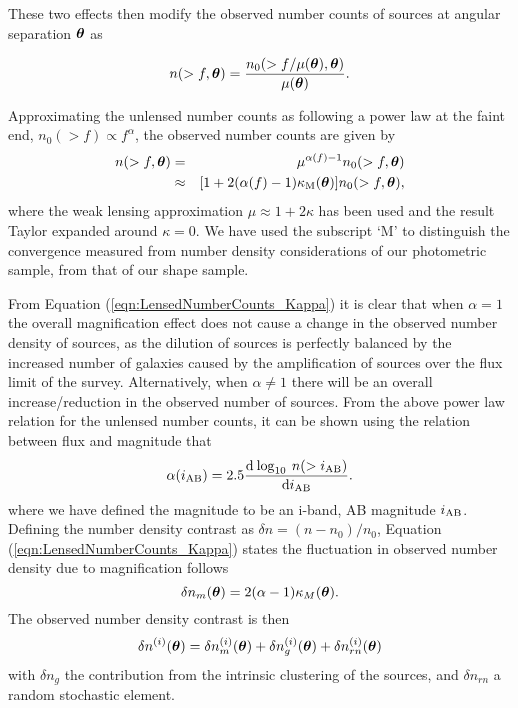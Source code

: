 \documentclass[useAMS,usenatbib,times,letter,amssymb]{mn2e}
\def\be{\begin{equation}}
\def\ee{\end{equation}}
\def\bea{\begin{eqnarray}}
\def\eea{\end{eqnarray}}
\newcommand{\bm}[1]{\mbox{\boldmath{$#1$}}}   %
\begin{document}
These two effects then modify the observed number counts  of sources at angular separation ${\bm \theta}$ as 

\begin{equation}\label{eqn:Lensed-UnlensedNumberCounts}
n(>f,{\bm \theta}) = \frac{n_0(>f/\mu({\bm\theta}),{\bm\theta})}{\mu({\bm\theta})}.
\end{equation}

Approximating the unlensed number counts as following a power law at the faint end, $n_0(>f) \propto f^\alpha$, the observed number counts are given by
\bea\label{eqn:LensedNumberCounts_Kappa}
n(>f, {\bm \theta}) &=& \mu^{\alpha(f)-1}n_0(>f,{\bm \theta})\nonumber\\ &\approx& [1+2(\alpha(f)-1)\kappa_{\rm M}(\bm{\theta})]n_0(>f,{\bm \theta}), 
\eea
where the weak lensing approximation $\mu \approx 1+2\kappa$ has been used and the result Taylor expanded around $\kappa = 0$. We have used the subscript `M' to distinguish the convergence measured from number density considerations of our photometric sample, from that of our shape sample.

From Equation (\ref{eqn:LensedNumberCounts_Kappa}) it is clear that when $\alpha=1$ the overall magnification effect does not cause a change in the observed number density of sources, as the dilution of sources is perfectly balanced by the increased number of galaxies caused by the amplification of sources over the flux limit of the survey. Alternatively, when $\alpha \ne 1$ there will be an overall increase/reduction in the observed number of sources. From the above power law relation for the unlensed number counts, it can be shown using the relation between flux and magnitude that 
\be\label{Eqn:Alpha_Magnitude}
\alpha(i_{\rm AB}) = 2.5\frac{{\rm d}\:{\log_{10}\:n(>i_{\rm AB})}}{{\rm d}i_{\rm AB}}.
\ee
where we have defined the magnitude to be an i-band, AB magnitude $i_{\rm AB}$. Defining the number density contrast as $\delta n = (n-n_0)/n_0$, Equation (\ref{eqn:LensedNumberCounts_Kappa}) states the fluctuation in observed number density due to magnification follows
\be\label{eqn:NDensityContrastFluctuationMag}
\delta n_m(\bm{\theta}) = 2(\alpha-1)\kappa_{M}(\bm{\theta}).
\ee %
 The observed number density contrast is then
\be\label{eqn:NumberDensityContributions}
\delta n^{(i)}(\bm{\theta}) = \delta n_m^{(i)}(\bm{\theta}) + \delta n_g^{(i)}(\bm{\theta}) + \delta n_{rn}^{(i)}(\bm{\theta})
\ee
with $\delta n_g$ the contribution from the intrinsic clustering of the sources, and $\delta n_{rn}$ a random stochastic element. 
\end{document}
